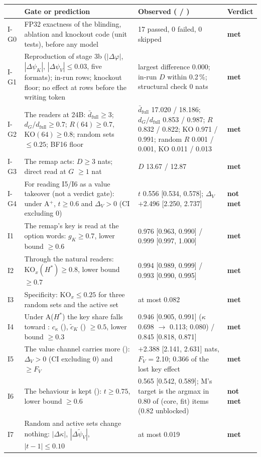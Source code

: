 \begin{tabular}{p{}p{}p{}p{}}
\toprule
 & Gate or prediction & Observed (\fmtOpt{} / \fmtLetter{}) & Verdict \\
\midrule
I-G0 & FP32 exactness of the blinding, ablation and knockout code (unit tests), before any model & 17 passed, 0 failed, 0 skipped & \textbf{met} \\
I-G1 & Reproduction of stage 3b ($|\Delta\varphi|$, $|\Delta\psi_K|$, $|\Delta\psi_V| \leq 0.03$, five formats); in-run rows; knockout floor; no effect at rows before the writing token & largest difference 0.000; in-run $D$ within 0.2\,\%; structural check 0 nats & \textbf{met} \\
I-G2 & The readers at 24B: $\bar d_{\mathrm{full}} \geq 3$; $d_G/d_{\mathrm{full}} \geq 0.7$; $R(64) \geq 0.7$, $\mathrm{KO}(64) \geq 0.8$; random sets $\leq 0.25$; BF16 floor & $\bar d_{\mathrm{full}}$ 17.020 / 18.186; $d_G/d_{\mathrm{full}}$ 0.853 / 0.987; $R$ 0.832 / 0.822; KO 0.971 / 0.991; random $R$ 0.001 / 0.001, KO 0.011 / 0.013 & \textbf{met} \\
I-G3 & The remap acts: $D \geq 3$ nats; direct read at $G$ $\geq 1$ nat & $D$ 13.67 / 12.87 & \textbf{met} \\
I-G4 & For reading I5/I6 as a value takeover (not a verdict gate): under A$^+$, $t \geq 0.6$ and $\Delta_V > 0$ (CI excluding 0) & $t$ 0.556 [0.534, 0.578]; $\Delta_V$ $+$2.496 [2.250, 2.737] & \textbf{not met} \\
\midrule
I1 & The remap's key is read at the option words: $g_K \geq 0.7$, lower bound $\geq 0.6$ & 0.976 [0.963, 0.990] / 0.999 [0.997, 1.000] & \textbf{met} \\
I2 & Through the natural readers: $\mathrm{KO}_x(H^*) \geq 0.8$, lower bound $\geq 0.7$ & 0.994 [0.989, 0.999] / 0.993 [0.990, 0.995] & \textbf{met} \\
I3 & Specificity: $\mathrm{KO}_x \leq 0.25$ for three random sets and the active set & at most 0.082 & \textbf{met} \\
I4 & Under A($H^*$) the key share falls toward \fmtNone{}: $c_\kappa$ (\fmtOpt{}), $\tilde c_K$ (\fmtLetter{}) $\geq 0.5$, lower bound $\geq 0.3$ & 0.946 [0.905, 0.991] ($\kappa$ 0.698 $\to$ 0.113; \fmtNone{} 0.080) / 0.845 [0.818, 0.871] & \textbf{met} \\
I5 & The value channel carries more (\fmtOpt{}): $\Delta_V > 0$ (CI excluding 0) and $\geq F_V$ & $+$2.388 [2.141, 2.631] nats, $F_V$ = 2.10; 0.366 of the lost key effect & \textbf{met} \\
I6 & The behaviour is kept (\fmtOpt{}): $t \geq 0.75$, lower bound $\geq 0.6$ & 0.565 [0.542, 0.589]; M's target is the argmax in 0.80 of (core, fit) items (0.82 unblocked) & \textbf{not met} \\
I7 & Random and active sets change nothing: $|\Delta\kappa|$, $|\Delta\tilde\psi_V|$, $|t-1| \leq 0.10$ & at most 0.019 & \textbf{met} \\
\bottomrule
\end{tabular}
